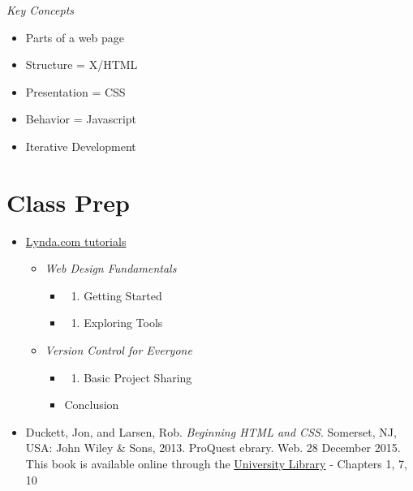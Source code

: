\documentclass[]{book}
\providecommand{\tightlist}{%
  \setlength{\itemsep}{0pt}\setlength{\parskip}{0pt}}
\begin{document}
\emph{Key Concepts}

\begin{itemize}
\item
  Parts of a web page
\item
  Structure = X/HTML
\item
  Presentation = CSS
\item
  Behavior = Javascript
\item
  Iterative Development
\end{itemize}

\section{Class Prep}\label{week02-prep}

\begin{itemize}
\item
  \href{http://www.lynda.com/SharedPlaylist/2b710369c9ec4d8c964467225c6610ad?org=unm.edu}{Lynda.com
  tutorials}

  \begin{itemize}
  \tightlist
  \item
    \emph{Web Design Fundamentals}

    \begin{itemize}
    \item
      \begin{enumerate}
      \def\labelenumi{\arabic{enumi}.}
      \setcounter{enumi}{2}
      \tightlist
      \item
        Getting Started
      \end{enumerate}
    \item
      \begin{enumerate}
      \def\labelenumi{\arabic{enumi}.}
      \setcounter{enumi}{3}
      \tightlist
      \item
        Exploring Tools
      \end{enumerate}
    \end{itemize}
  \item
    \emph{Version Control for Everyone}

    \begin{itemize}
    \item
      \begin{enumerate}
      \def\labelenumi{\arabic{enumi}.}
      \setcounter{enumi}{4}
      \tightlist
      \item
        Basic Project Sharing
      \end{enumerate}
    \item
      Conclusion
    \end{itemize}
  \end{itemize}
\item
  Duckett, Jon, and Larsen, Rob. \emph{Beginning HTML and CSS}.
  Somerset, NJ, USA: John Wiley \& Sons, 2013. ProQuest ebrary. Web. 28
  December 2015. This book is available online through the
  \href{http://site.ebrary.com.libproxy.unm.edu/lib/unma/detail.action?docID=10667426}{University
  Library} - Chapters 1, 7, 10
\end{itemize}
\end{document}
